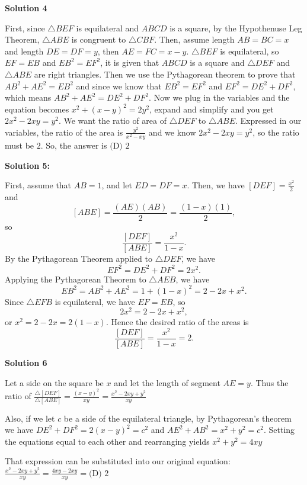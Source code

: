 \begin{enumerate}
\textbf{Solution 4}

First, since $\bigtriangleup BEF$ is equilateral and $ABCD$ is a square, by the Hypothenuse Leg Theorem, $\bigtriangleup ABE$ is congruent to $\bigtriangleup CBF$. Then, assume length $AB = BC = x$ and length $DE = DF = y$, then $AE = FC = x - y$. $\bigtriangleup BEF$ is equilateral, so $EF = EB$ and $EB^2 = EF^2$, it is given that $ABCD$ is a square and $\bigtriangleup DEF$ and $\bigtriangleup ABE$ are right triangles. Then we use the Pythagorean theorem to prove that $AB^2 + AE^2 = EB^2$ and since we know that $EB^2 = EF^2$ and $EF^2 = DE^2 + DF^2$, which means $AB^2 + AE^2 = DE^2 + DF^2$. Now we plug in the variables and the equation becomes $x^2 + (x-y)^2 = 2y^2$, expand and simplify and you get $2x^2 - 2xy = y^2$. We want the ratio of area of $\bigtriangleup DEF$ to $\bigtriangleup ABE$. Expressed in our variables, the ratio of the area is $\frac{y^2}{x^2 - xy}$ and we know $2x^2 - 2xy = y^2$, so the ratio must be $2$. So, the answer is $\boxed{\text{(D) }2}$




\textbf{Solution 5:}

First, assume that $AB=1$, and let $ED = DF = x$. Then, we have $[DEF] = \frac{x^2}{2}$ and 
 \[[ABE] = \frac{(AE)(AB)}{2} = \frac{(1-x)(1)}{2},\]so 
 \[\frac{[DEF]}{[ABE]} = \frac{x^2}{1-x} .\]By the Pythagorean Theorem applied to $\triangle DEF$, we have 
 \[EF^2 = DE^2 + DF^2 = 2x^2.\]Applying the Pythagorean Theorem to $\triangle AEB$, we have 
 \[EB^2 = AB^2 + AE^2 = 1 + (1-x)^2 = 2 - 2x + x^2.\]Since $\triangle EFB$ is equilateral, we have $EF = EB$, so 
 \[2x^2 = 2-2x + x^2,\]or $x^2 = 2-2x= 2(1-x)$. Hence the desired ratio of the areas is 
 \[\frac{[DEF]}{[ABE]} = \frac{x^2}{1-x} = \boxed{2}.\]




\textbf{Solution 6}

Let a side on the square be $x$ and let the length of segment $AE=y$. Thus the ratio of $\frac{\triangle [DEF]}{\triangle [ABE]}=\frac{(x-y)^2}{xy}=\frac{x^2-2xy+y^2}{xy}$

 Also, if we let $c$ be a side of the equilateral triangle, by Pythagorean's theorem we have $DE^2 + DF^2 = 2(x-y)^2 = c^2$ and $AE^2 + AB^2 = x^2 + y^2 = c^2$. Setting the equations equal to each other and rearranging yields $x^2+y^2=4xy$

 That expression can be substituted into our original equation:$\frac{x^2-2xy+y^2}{xy} = \frac{4xy-2xy}{xy} = \boxed{\text{(D) }2}$


\end{enumerate}
